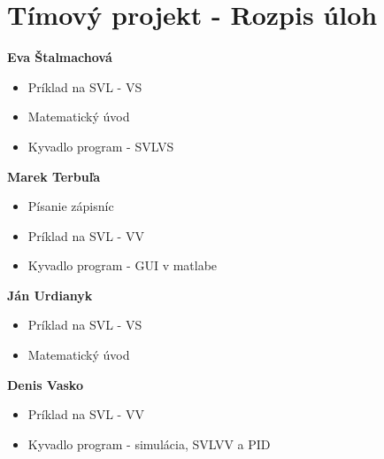 

    \section{Tímový projekt - Rozpis úloh}
    \textbf{Eva Štalmachová}
    \begin{itemize}
        \item Príklad na SVL - VS
        \item Matematický úvod 
        \item Kyvadlo program - SVLVS
    \end{itemize}
    \textbf{Marek Terbuľa}
    \begin{itemize}
        \item Písanie zápisníc
        \item Príklad na SVL - VV
        \item Kyvadlo program - GUI v matlabe
    \end{itemize}
    \textbf{Ján Urdianyk}
    \begin{itemize}
        \item Príklad na SVL - VS
        \item Matematický úvod 
    \end{itemize}
    \textbf{Denis Vasko}
    \begin{itemize}
        \item Príklad na SVL - VV
        \item Kyvadlo program - simulácia, SVLVV a PID
    \end{itemize}

